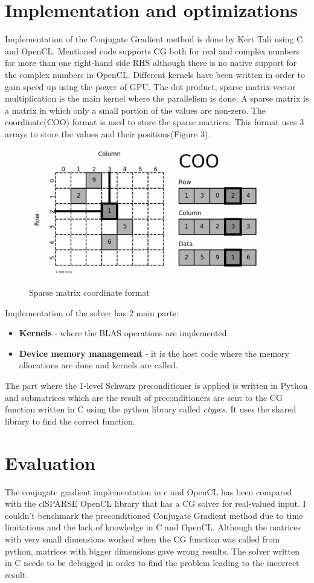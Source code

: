 \documentclass[times]{TRR}
\begin{document}
\section{Implementation and optimizations}
Implementation of the Conjugate Gradient method is done by Kert Tali using C and OpenCL. Mentioned code supports CG both for real and complex numbers for more than one right-hand side RHS although there is no native support for the complex numbers in OpenCL. Different kernels have been written in order to gain speed up using the power of GPU. The dot product, sparse matrix-vector multiplication is the main kernel where the parallelism is done. A sparse matrix is a matrix in which only a small portion of the values are non-zero. The coordinate(COO) format is used to store the sparse matrices. This format uses 3 arrays to store the values and their positions(Figure 3).
\begin{figure}[h]
    \includegraphics[scale=0.1]{images/coo-format.png}
    \caption{Sparse matrix coordinate format}
\end{figure}
\begin{par}
Implementation of the solver has 2 main parts: 
\begin{itemize}
    \item \textbf{Kernels} - where the BLAS operations are implemented.
    \item \textbf{Device memory management} - it is the host code where the memory allocations are done and kernels are called.
\end{itemize}
The part where the 1-level Schwarz preconditioner is applied is written in Python and submatrices which are the result of preconditioners are sent to the CG function written in C using the python library called \emph{ctypes}. It uses the shared library to find the correct function.
\end{par}
\section{Evaluation}
The conjugate gradient implementation in c and OpenCL has been compared with the clSPARSE OpenCL library that has a CG solver for real-valued input. I couldn't benchmark the preconditioned Conjugate Gradient method due to time limitations and the lack of knowledge in C and OpenCL. Although the matrices with very small dimensions worked when the CG function was called from python, matrices with bigger dimensions gave wrong results. The solver written in C needs to be debugged in order to find the problem leading to the incorrect result.
\end{document}
